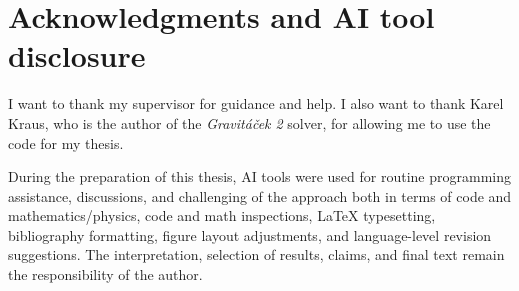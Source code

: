 \chapter*{Acknowledgments and AI tool disclosure}

I want to thank my supervisor for guidance and help. I also want to thank Karel Kraus, who is the author of the \textit{Gravitáček 2} solver, for allowing me to use the code for my thesis.

During the preparation of this thesis, AI tools were used for routine programming assistance, discussions, and challenging of the approach both in terms of code and mathematics/physics, code and math inspections, LaTeX typesetting, bibliography formatting, figure layout adjustments, and language-level revision suggestions. The interpretation, selection of results, claims, and final text remain the responsibility of the author.
